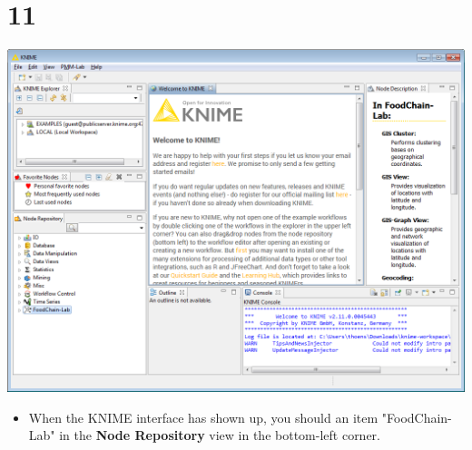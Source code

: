 \documentclass{beamer}
\begin{document}
\section{11}
\begin{frame}
	\begin{center}
  		\includegraphics[height=0.6\textheight]{11.png}
	\end{center}
	\begin{itemize}
		\item When the KNIME interface has shown up, you should an item "FoodChain-Lab" in the \textbf{Node Repository} view in the bottom-left corner.
	\end{itemize}
\end{frame}
\end{document}
